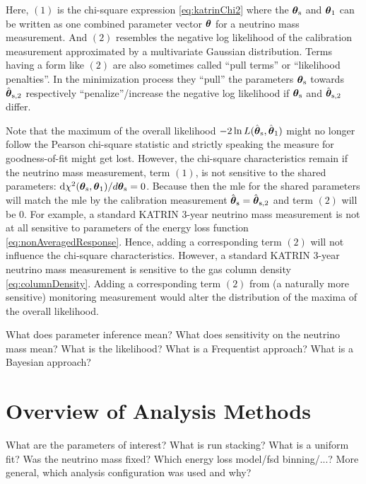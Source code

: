 Here, $(1)$ is the chi-square expression \eqref{eq:katrinChi2} where the $\boldsymbol{\mathbf{\theta}}_\mathrm{s}$ and $\boldsymbol{\mathbf{\theta}}_1$ can be written as one combined parameter vector $\boldsymbol{\mathbf{\theta}}$ for a neutrino mass measurement. And $(2)$ resembles the negative log likelihood of the calibration measurement approximated by a multivariate Gaussian distribution. Terms having a form like $(2)$ are also sometimes called ``pull terms'' or ``likelihood penalties''. In the minimization process they ``pull'' the parameters $\boldsymbol{\mathbf{\theta}}_\mathrm{s}$ towards $\hat{\boldsymbol{\mathbf{\theta}}}_\mathrm{s,2}$ respectively ``penalize''/increase the negative log likelihood if $\boldsymbol{\mathbf{\theta}}_\mathrm{s}$ and $\hat{\boldsymbol{\mathbf{\theta}}}_\mathrm{s,2}$ differ.


\newcommand{\CombLmax}{-2\ln L(\hat{\paramVec}_\mathrm{s}, \hat{\paramVec}_1)}
Note that the maximum of the overall likelihood $\CombLmax$ might no longer follow the Pearson chi-square statistic and strictly speaking the measure for goodness-of-fit might get lost. However, the chi-square characteristics remain if the neutrino mass measurement, term $(1)$, is not sensitive to the shared parameters: $\mathop{}\!\mathrm{d} \chi^2(\boldsymbol{\mathbf{\theta}}_\mathrm{s}, \boldsymbol{\mathbf{\theta}}_1) /d \boldsymbol{\mathbf{\theta}}_\mathrm{s} = 0$. Because then the \gls{mle} for the shared parameters will match the \gls{mle} by the calibration measurement $\hat{\boldsymbol{\mathbf{\theta}}}_\mathrm{s} = \hat{\boldsymbol{\mathbf{\theta}}}_{\mathrm{s},2}$ and term $(2)$ will be 0. For example, a standard KATRIN 3-year neutrino mass measurement is not at all sensitive to parameters of the energy loss function \eqref{eq:nonAveragedResponse}. Hence, adding a corresponding term $(2)$ will not influence the chi-square characteristics. However, a standard KATRIN 3-year neutrino mass measurement is sensitive to the gas column density \eqref{eq:columnDensity}. Adding a corresponding term $(2)$ from (a naturally more sensitive) monitoring measurement would alter the distribution of the maxima of the overall likelihood. 



What does parameter inference mean? What does sensitivity on the neutrino mass mean? What is the likelihood? What is a Frequentist approach? What is a Bayesian approach? 
\section{Overview of Analysis Methods}
What are the parameters of interest? What is run stacking? What is a uniform fit? Was the neutrino mass fixed? Which energy loss model/fsd binning/...? More general, which analysis configuration was used and why?

